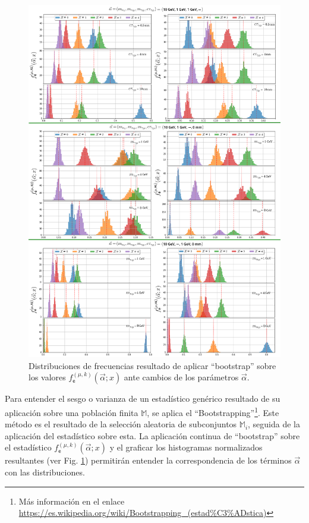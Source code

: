 \begin{figure}[!ht]
\centering
\includegraphics[width=.9\textwidth]{Simulacion/imagenes/Distribucion_Entries.png}
\caption{Distribuciones de frecuencias resultado de aplicar ``bootstrap'' sobre los valores $f^{(\mu, k)}_\textsf{e} (\vec{\alpha}; x)$ ante cambios de los parámetros $\vec{\alpha}$.}
\label{entradas}
\end{figure}

Para entender el sesgo o varianza de un estadístico genérico resultado de su aplicación sobre una población finita $\mathbb{M}$, se aplica el ``Bootstrapping''\footnote{Más información en el enlace \href{https://es.wikipedia.org/wiki/Bootstrapping\_(estad\%C3\%ADstica)}{https://\-es.\-wi\-ki\-pe\-dia.\-org/\-wi\-ki/\-Boots\-tra\-pping\_(es\-tad\-\%C3\-\%AD\-sti\-ca)}}. Este método es el resultado de la selección aleatoria de subconjuntos $\mathbb{M}_i$, seguida de la aplicación del estadístico sobre esta. La aplicación continua de ``bootstrap'' sobre el estadístico $f^{(\mu, k)}_\textsf{e} (\vec{\alpha}; x)$ y el graficar los histogramas normalizados resultantes (ver Fig. \ref{entradas}) permitirán entender la correspondencia de los términos $\vec{\alpha}$ con las distribuciones.

